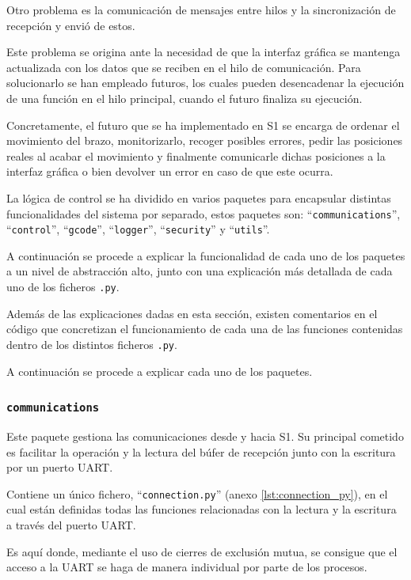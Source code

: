 Otro problema es la comunicación de mensajes entre hilos y la sincronización de recepción y envió de estos. 

Este problema se origina ante la necesidad de que la interfaz gráfica se mantenga actualizada con los datos que se reciben en el hilo de comunicación. Para solucionarlo se han empleado futuros, los cuales pueden desencadenar la ejecución de una función en el hilo principal, cuando el futuro finaliza su ejecución.

Concretamente, el futuro que se ha implementado en \ac{S1} se encarga de ordenar el movimiento del brazo, monitorizarlo, recoger posibles errores, pedir las posiciones reales al acabar el movimiento y finalmente comunicarle dichas posiciones a la interfaz gráfica o bien devolver un error en caso de que este ocurra.

La lógica de control se ha dividido en varios paquetes para encapsular distintas funcionalidades del sistema por separado, estos paquetes son: ``\texttt{communications}'', ``\texttt{control}'', ``\texttt{gcode}'', ``\texttt{logger}'', ``\texttt{security}'' y ``\texttt{utils}''.

A continuación se procede a explicar la funcionalidad de cada uno de los paquetes a un nivel de abstracción alto, junto con una explicación más detallada de cada uno de los ficheros \texttt{.py}.

Además de las explicaciones dadas en esta sección, existen comentarios en el código que concretizan el funcionamiento de cada una de las funciones contenidas dentro de los distintos ficheros \texttt{.py}.

A continuación se procede a explicar cada uno de los paquetes.

\subsubsection{\texttt{communications}}
Este paquete gestiona las comunicaciones desde y hacia \ac{S1}. Su principal cometido es facilitar la operación y la lectura del búfer de recepción junto con la escritura por un puerto UART.

Contiene un único fichero, ``\texttt{connection.py}'' (anexo \ref{lst:connection_py}), en el cual están definidas todas las funciones relacionadas con la lectura y la escritura a través del puerto UART.

Es aquí donde, mediante el uso de cierres de exclusión mutua, se consigue que el acceso a la UART se haga de manera individual por parte de los procesos.

